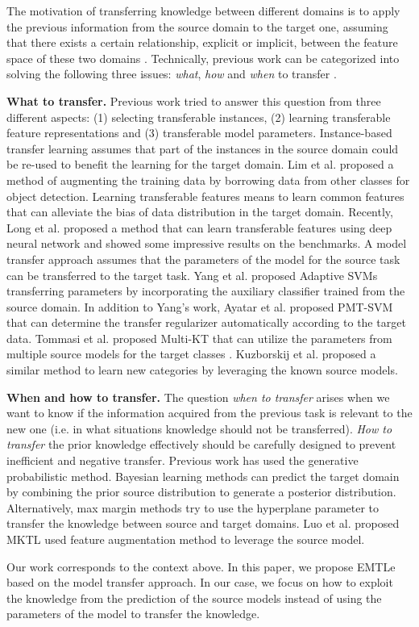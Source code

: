 The motivation of transferring knowledge between different domains is to apply the previous information from the source domain to the target one, assuming that there exists a certain relationship, explicit or implicit, between the feature space of these two domains \cite{pan2010survey}. Technically, previous work can be categorized into solving the following three issues: \textit{what}, \textit{how} and \textit{when} to transfer \cite{tommasi2014learning}.


\textbf{What to transfer.} Previous work tried to answer this question from three different aspects: (1) selecting transferable instances, (2) learning transferable feature representations and (3) transferable model parameters. Instance-based transfer learning assumes that part of the instances in the source domain could be re-used to benefit the learning for the target domain. Lim et al.\cite{lim2012transfer} proposed a method of augmenting the training data by borrowing data from other classes for object detection. Learning transferable features means to learn common features that can alleviate the bias of data distribution in the target domain. Recently, Long et al. \cite{LongICML15} proposed a method that can learn transferable features using deep neural network and showed some impressive results on the  benchmarks. 
A model transfer approach assumes that the parameters of the model for the source task can be transferred to the target task. Yang et al. \cite{yang2007cross} proposed Adaptive SVMs transferring parameters by incorporating the auxiliary classifier trained from the source domain. 
In addition to Yang's work, Ayatar et al. \cite{aytar2011tabula} proposed PMT-SVM that can determine the transfer regularizer automatically according to the target data. 
Tommasi et al. \cite{tommasi2014learning} proposed Multi-KT that can utilize the parameters from multiple source models for the target classes .
Kuzborskij et al. \cite{kuzborskij2013n} proposed a similar method to learn new categories by leveraging the known source models.

\textbf{When and how to transfer.} The question \textit{when to transfer} arises when we want to know if the information acquired from the previous task is relevant to the new one (i.e. in what situations knowledge should not be transferred). 
\textit{How to transfer} the prior knowledge effectively should be carefully designed to prevent inefficient and negative transfer. Previous work \cite{davis2009deep,wang2014active,zhou2014multi} has used the generative probabilistic method. Bayesian learning methods can predict the target domain by combining the prior source distribution to generate a posterior distribution. Alternatively, max margin methods\cite{kuzborskij2013n,tommasi2010safety,yang2007cross} try to use the hyperplane parameter to transfer the knowledge between source and target domains. Luo et al. \cite{jie2011multiclass} proposed MKTL used feature augmentation method to leverage the source model.

Our work corresponds to the context above. In this paper, we propose EMTLe based on the model transfer approach. In our case, we focus on how to exploit the knowledge from the prediction of the source models instead of using the parameters of the model to transfer the knowledge.

